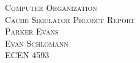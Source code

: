 \begin{titlepage}
\begin{center} 
\vspace*{2cm}
\textsc{\huge Computer Organization}\\[1cm]
\textsc{\LARGE Cache Simulator Project Report}\\[13cm]

\textsc{\large Parker Evans}\\[0.25cm]
\textsc{\large Evan Schlomann} \\[0.25cm]
\textsc{ECEN 4593}

\end{center}
\end{titlepage}